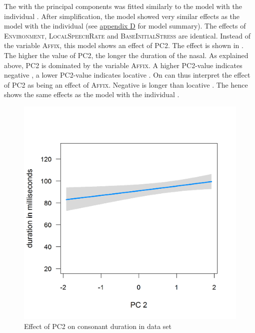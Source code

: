 The  with the principal components was fitted similarly to the model with the individual . After simplification, the model showed very similar effects as the model with the individual  (see \hyperref[Appendix D: model summaries corpus]{appendix D} for model summary). The effects of \textsc{Environment}, \textsc{LocalSpeechRate} and \textsc{BaseInitialStress} are identical. Instead of the variable \textsc{Affix}, this model shows an effect of \textsc{PC2}. The effect is shown in . The higher the value of \textsc{PC2}, the longer the duration of the nasal. As explained above, \textsc{PC2} is dominated by the variable \textsc{Affix}. A higher \textsc{PC2}-value indicates negative , a lower \textsc{PC2}-value indicates locative . On can thus interpret the effect of \textsc{PC2} as being an effect of \textsc{Affix}. Negative  is longer than locative . The  hence shows the same effects as the model with the individual .


\begin{figure}
	
	\includegraphics [scale=0.4] {images/Corpus/imPCAbsPC2.png}
	\caption{Effect of PC2 on consonant duration in data set}
	\label{fig:PC2 in Corpus}
\end{figure}



